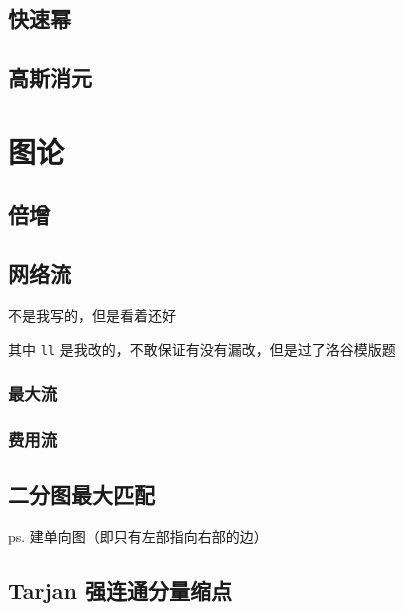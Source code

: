\documentclass{article}
\begin{document}
\subsection{快速幂}



\subsection{高斯消元}



\section{图论}

\subsection{倍增}



\subsection{网络流}

不是我写的，但是看着还好

其中 \lstinline{ll} 是我改的，不敢保证有没有漏改，但是过了洛谷模版题

\subsubsection{最大流}



\subsubsection{费用流}



\subsection{二分图最大匹配}

ps. 建单向图（即只有左部指向右部的边）



\subsection{Tarjan 强连通分量缩点}


\end{document}
